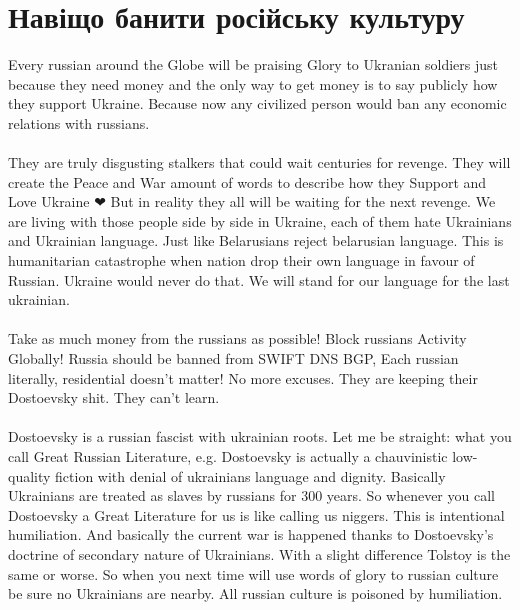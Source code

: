 \section{Навіщо банити російську культуру}

Every russian around the Globe will be praising Glory to Ukranian soldiers just because they need money and the only way to get money is to say publicly how they support Ukraine. Because now any civilized person would ban any economic relations with russians.
\\
\\
They are truly disgusting stalkers that could wait centuries for revenge. They will create the Peace and War amount of words to describe how they Support and Love Ukraine ❤ But in reality they all will be waiting for the next revenge. We are living with those people side by side in Ukraine, each of them hate Ukrainians and Ukrainian language. Just like Belarusians reject belarusian language. This is humanitarian catastrophe when nation drop their own language in favour of Russian. Ukraine would never do that. We will stand for our language for the last ukrainian.
\\
\\
Take as much money from the russians as possible! Block russians Activity Globally! Russia should be banned from SWIFT DNS BGP, Each russian literally, residential doesn't matter! No more excuses. They are keeping their Dostoevsky shit. They can't learn.
\\
\\
Dostoevsky is a russian fascist with ukrainian roots. Let me be straight: what you call Great Russian Literature, e.g. Dostoevsky is actually a chauvinistic low-quality fiction with denial of ukrainians language and dignity. Basically Ukrainians are treated as slaves by russians for 300 years. So whenever you call Dostoevsky a Great Literature for us is like calling us niggers. This is intentional humiliation. And basically the current war is happened thanks to Dostoevsky's doctrine of secondary nature of Ukrainians. With a slight difference Tolstoy is the same or worse. So when you next time will use words of glory to russian culture be sure no Ukrainians are nearby. All russian culture is poisoned by humiliation.

\normalsize
